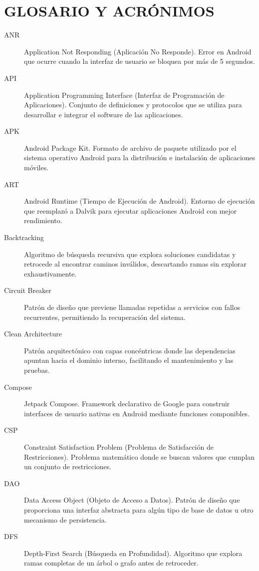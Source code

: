 \chapter*{GLOSARIO Y ACRÓNIMOS}

\begin{description}
    \item[ANR] Application Not Responding (Aplicación No Responde). Error en Android que ocurre cuando la interfaz de usuario se bloquea por más de 5 segundos.
    \item[API] Application Programming Interface (Interfaz de Programación de Aplicaciones). Conjunto de definiciones y protocolos que se utiliza para desarrollar e integrar el software de las aplicaciones.
    \item[APK] Android Package Kit. Formato de archivo de paquete utilizado por el sistema operativo Android para la distribución e instalación de aplicaciones móviles.
    \item[ART] Android Runtime (Tiempo de Ejecución de Android). Entorno de ejecución que reemplazó a Dalvik para ejecutar aplicaciones Android con mejor rendimiento.
    \item[Backtracking] Algoritmo de búsqueda recursiva que explora soluciones candidatas y retrocede al encontrar caminos inválidos, descartando ramas sin explorar exhaustivamente.
    \item[Circuit Breaker] Patrón de diseño que previene llamadas repetidas a servicios con fallos recurrentes, permitiendo la recuperación del sistema.
    \item[Clean Architecture] Patrón arquitectónico con capas concéntricas donde las dependencias apuntan hacia el dominio interno, facilitando el mantenimiento y las pruebas.
    \item[Compose] Jetpack Compose. Framework declarativo de Google para construir interfaces de usuario nativas en Android mediante funciones componibles.
    \item[CSP] Constraint Satisfaction Problem (Problema de Satisfacción de Restricciones). Problema matemático donde se buscan valores que cumplan un conjunto de restricciones.
    \item[DAO] Data Access Object (Objeto de Acceso a Datos). Patrón de diseño que proporciona una interfaz abstracta para algún tipo de base de datos u otro mecanismo de persistencia.
    \item[DFS] Depth-First Search (Búsqueda en Profundidad). Algoritmo que explora ramas completas de un árbol o grafo antes de retroceder.

\end{description}
